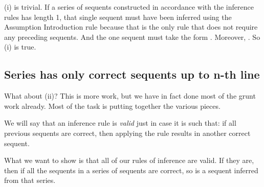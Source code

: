 (i) is trivial. If a series of sequents constructed in accordance with the 
inference rules has length 1, that single sequent must have been inferred using 
the Assumption Introduction rule because that is the only rule that does not 
require any preceding sequents.  And the one sequent must take the form 
. Moreover, . So (i) is true.

\subsection{Series has only correct sequents up to n-th line}

What about (ii)? This is more work, but we have in fact done most of the grunt 
work already. Most of the task is putting together the various pieces. 

We will say that an inference rule is \emph{valid} just in case it is such that: 
if all previous sequents are correct, then applying the rule results in 
another correct sequent. 

What we want to show is that all of our rules of inference are valid. If they 
are, then if all the sequents in a series of  sequents are correct, so is a 
sequent inferred from that series.

